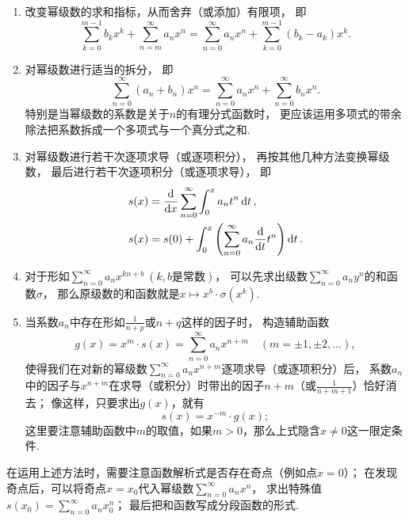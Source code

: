 \begin{enumerate}
\begin{enumerate}
		\item 改变幂级数的求和指标，从而舍弃（或添加）有限项，
		即\[
			\sum_{k=0}^{m-1} b_k x^k + \sum_{n=m}^\infty a_n x^n
			= \sum_{n=0}^\infty a_n x^n + \sum_{k=0}^{m-1} (b_k-a_k) x^k.
		\]

		\item 对幂级数进行适当的拆分，
		即\[
			\sum_{n=0}^\infty (a_n + b_n) x^n
			= \sum_{n=0}^\infty a_n x^n
			+ \sum_{n=0}^\infty b_n x^n.
		\]
		特别是当幂级数的系数是关于\(n\)的有理分式函数时，
		更应该运用多项式的带余除法把系数拆成一个多项式与一个真分式之和.

		\item 对幂级数进行若干次逐项求导（或逐项积分），
		再按其他几种方法变换幂级数，
		最后进行若干次逐项积分（或逐项求导），
		即\begin{align*}
			s(x) &= \dv{x} \sum_{n=0}^\infty \int_0^x a_n t^n \dd{t}, \\
			s(x) &= s(0) + \int_0^x \left(\sum_{n=0}^\infty a_n \dv{t} t^n\right) \dd{t}.
		\end{align*}

		\item 对于形如\(\sum_{n=0}^\infty a_n x^{kn+b}\ (\text{$k,b$是常数})\)，
		可以先求出级数\(\sum_{n=0}^\infty a_n y^n\)的和函数\(\sigma\)，
		那么原级数的和函数就是\(x \mapsto x^b \cdot \sigma(x^k)\).

		\item 当系数\(a_n\)中存在形如\(\frac{1}{n+p}\)或\(n+q\)这样的因子时，
		构造辅助函数\[
			g(x) = x^m \cdot s(x) = \sum_{n=0}^\infty a_n x^{n+m}
			\quad(m=\pm1,\pm2,\dotsc),
		\]
		使得我们在对新的幂级数\(\sum_{n=0}^\infty a_n x^{n+m}\)逐项求导（或逐项积分）后，
		系数\(a_n\)中的因子与\(x^{n+m}\)在求导（或积分）时带出的因子\(n+m\)（或\(\frac{1}{n+m+1}\)）恰好消去；
		像这样，只要求出\(g(x)\)，就有\[
			s(x) = x^{-m} \cdot g(x);
		\]
		这里要注意辅助函数中\(m\)的取值，如果\(m>0\)，那么上式隐含\(x\neq0\)这一限定条件.
	\end{enumerate}
	在运用上述方法时，需要注意函数解析式是否存在奇点（例如点\(x=0\)）；
	在发现奇点后，可以将奇点\(x=x_0\)代入幂级数\(\sum_{n=0}^\infty a_n x^n\)，
	求出特殊值\(s(x_0) = \sum_{n=0}^\infty a_n x_0^n\)；
	最后把和函数写成分段函数的形式.
\end{enumerate}


